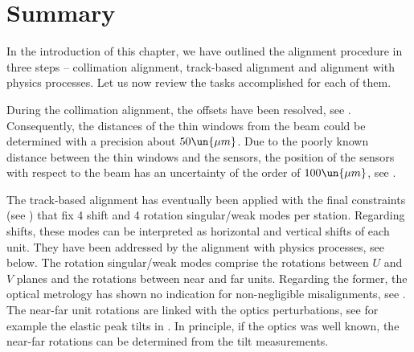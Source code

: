 \iffalse
\htab{al el ylyr}{
Left: the results of the elastic alignment method 4 -- fits of $y^{56}$ vs.~$y^{45}$ data. \TODO{}}{
\omit&\multispan2\bhrulefill\cr
\omit&\strut\hbox{near units}&\hbox{far units}\cr\bln
\hbox{21 Sep}    & -40.4 \pm   21.3&  78.6 \pm   21.4\cr\ln
\hbox{05 Oct}    & 170.8 \pm   26.3& 264.5 \pm   28.6\cr\ln
\hbox{07 Oct}    &  95.4 \pm   20.2& 181.9 \pm   21.8\cr\ln
\hbox{24 Oct}    & -75.8 \pm   10.7&  15.3 \pm   11.4\cr\ln
\hbox{26 Oct}    &  19.5 \pm    9.1&  98.6 \pm    9.9\cr\ln
\hbox{29-30 Oct} &-240.9 \pm    4.9&-158.3 \pm    4.9\cr\bln
}

-80		\pm30	&27		\pm31
377		\pm69	&477	\pm77
192		\pm55	&284	\pm61
-84		\pm30	&5		\pm33
56		\pm24	&145	\pm27
-270	\pm7	&-187	\pm7
\fi



\section[al sum]{Summary}

In the introduction of this chapter, we have outlined the alignment procedure in three steps -- collimation alignment, track-based alignment and alignment with physics processes. Let us now review the tasks accomplished for each of them.

\> During the collimation alignment, the  offsets have been resolved, see . Consequently, the distances of the  thin windows from the beam could be determined with a precision about $50\un{\mu m}$. Due to the poorly known distance between the thin windows and the sensors, the position of the sensors with respect to the beam has an uncertainty of the order of $100\un{\mu m}$, see .

\> The track-based alignment has eventually been applied with the final constraints (see ) that fix 4 shift and 4 rotation singular/weak modes per station. Regarding shifts, these modes can be interpreted as horizontal and vertical shifts of each unit. They have been addressed by the alignment with physics processes, see below. The rotation singular/weak modes comprise the rotations between $U$ and $V$ planes and the rotations between near and far units. Regarding the former, the optical metrology has shown no indication for non-negligible misalignments, see . The near-far unit rotations are linked with the optics perturbations, see for example the elastic peak tilts in . In principle, if the optics was well known, the near-far rotations can be determined from the tilt measurements.

